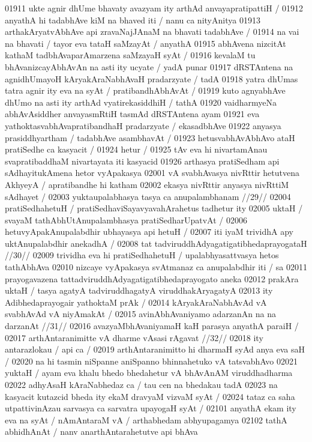 01911 ukte agnir dhUme bhavaty avazyam ity arthAd anvayapratipattiH /  
01912 anyathA hi tadabhAve kiM na bhaved iti / nanu ca nityAnitya
01913 arthakAryatvAbhAve api zravaNajJAnaM na bhavati tadabhAve /
01914 na vai na bhavati / tayor eva tataH saMzayAt / anyathA
01915 abhAvena nizcitAt kathaM tadbhAvaparAmarzena saMzayaH syAt / 
01916 kevalaM tu bhAvanizcayAbhAvAn na asti ity ucyate / yadA punar
01917 dRSTAntena na agnidhUmayoH kAryakAraNabhAvaH  pradarzyate / tadA
01918 yatra dhUmas tatra agnir ity eva na syAt / pratibandhAbhAvAt /
01919 kuto agnyabhAve dhUmo na asti ity arthAd vyatirekasiddhiH / tathA  
01920 vaidharmyeNa abhAvAsiddher anvayasmRtiH tasmAd dRSTAntena ayam
01921 eva yathoktasvabhAvapratibandhaH pradarzyate / ekasadbhAve  
01922 anyasya prasiddhyartham / tadabhAve asambhavAt / 
01923 	hetusvabhAvAbhAvo ataH pratiSedhe ca kasyacit /  
01924 	hetur / 
01925 tAv eva hi nivartamAnau svapratibaddhaM nivartayata iti kasyacid 
01926 arthasya pratiSedham api sAdhayitukAmena hetor vyApakasya  
02001 vA svabhAvasya nivRttir hetutvena AkhyeyA / apratibandhe hi katham 
02002 ekasya nivRttir anyasya nivRttiM sAdhayet /
02003 	yuktaupalabhasya tasya ca anupalambhanam //29//
02004 pratiSedhahetuH / pratiSedhaviSayavyavahArahetus tadhetur ity 
02005 uktaH / svayaM tathAbhUtAnupalambhasya pratiSedharUpatvAt /  
02006 hetuvyApakAnupalabdhir ubhayasya api hetuH /  
02007 	iti iyaM trividhA apy uktAnupalabdhir anekadhA /  
02008 	tat tadviruddhAdyagatigatibhedaprayogataH //30// 
02009 trividha eva hi pratiSedhahetuH / upalabhyasattvasya hetos tathAbhAva
02010 nizcaye vyApakasya svAtmanaz ca anupalabdhir iti / sa 
02011 prayogavazena tattadviruddhAdyagatigatibhedaprayogato  aneka
02012 prakAra uktaH / tasya agatyA tadviruddhagatyA viruddhakAryagatyA 
02013 ity Adibhedaprayogair yathoktaM prAk /  
02014 	kAryakAraNabhAvAd vA svabhAvAd vA niyAmakAt /  
02015 	avinAbhAvaniyamo adarzanAn na na darzanAt //31// 
02016 	avazyaMbhAvaniyamaH kaH parasya anyathA paraiH /  
02017 	arthAntaranimitte vA dharme vAsasi rAgavat //32// 
02018 ity antarazlokau / api ca /  
02019 	arthAntaranimitto hi dharmaH syAd anya eva saH /  
02020 na hi tasmin niSpanne aniSpanno bhinnahetuko vA tatsvabhAvo  
02021 yuktaH / ayam eva khalu bhedo bhedahetur vA bhAvAnAM viruddhadharma
02022 adhyAsaH kAraNabhedaz ca / tau cen na bhedakau tadA 
02023 na kasyacit kutazcid bheda ity ekaM dravyaM vizvaM syAt / 
02024 tataz ca saha utpattivinAzau sarvasya ca sarvatra upayogaH syAt /
02101 anyathA ekam ity eva na syAt / nAmAntaraM vA / arthabhedam abhyupagamya
02102 tathA abhidhAnAt / nanv anarthAntarahetutve api bhAva
